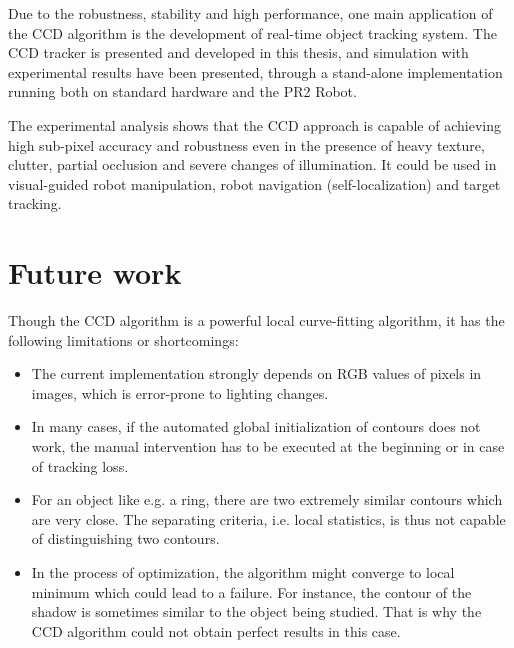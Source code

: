 Due to the robustness, stability and high performance, one main
application of the CCD algorithm is the development of real-time
object tracking system. The CCD tracker is presented and developed in
this thesis, and simulation with experimental results have been presented, through a
stand-alone implementation running both on
standard hardware and the PR2 Robot.


The experimental analysis shows that the CCD approach is capable of
achieving high sub-pixel accuracy and robustness even in the presence
of heavy texture, clutter, partial occlusion and severe changes of
illumination. It could be used in  visual-guided robot
manipulation, robot navigation (self-localization) and target
tracking.

\section{Future work}
\label{sec:feature}

Though the CCD algorithm is a powerful local curve-fitting algorithm,
it has the following limitations or shortcomings:
\begin{itemize}
\item The current implementation strongly depends on RGB values of pixels in
  images, which is error-prone to lighting changes.%
\item In many cases, if the automated global initialization of contours does
  not work, the manual intervention has to be executed at the beginning or
  in case of tracking loss.
\item For an object like e.g. a ring, there are two extremely similar
  contours which are very close. The separating criteria, i.e. local
  statistics, is thus not capable of distinguishing two contours.
\item In the process of optimization, the algorithm might converge to
  local minimum which could lead to a failure. For instance, the
  contour of the shadow is sometimes similar to the object being
  studied. That is why the CCD algorithm could not obtain perfect results in this case.
\end{itemize}

